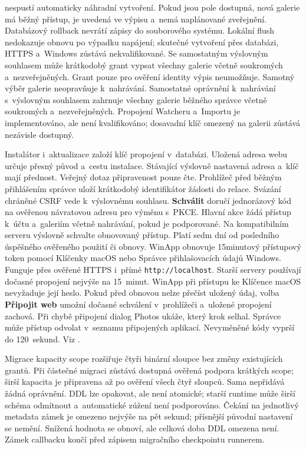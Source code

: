 \documentclass[11pt,a4paper]{article}
\newcommand{\filepath}[1]{\path{#1}}
\newcommand{\ui}[1]{\textbf{#1}}
\begin{document}
nespustí automaticky náhradní vytvoření. Pokud jsou pole dostupná, nová galerie má běžný přístup, je uvedená
ve výpisu a~nemá naplánované zveřejnění. Databázový rollback
nevrátí zápisy do souborového systému.
Lokální flush nedokazuje obnovu po výpadku napájení; skutečné vytvoření přes
databázi, HTTPS a~Windows zůstává nekvalifikované.
Se samostatným výslovným souhlasem může krátkodobý grant
vypsat všechny galerie včetně soukromých a~nezveřejněných. Grant pouze pro
ověření identity výpis neumožňuje. Samotný výběr galerie neopravňuje
k~nahrávání. Samostatné oprávnění k~nahrávání s~výslovným souhlasem zahrnuje
všechny galerie běžného správce včetně soukromých a~nezveřejněných.
Propojení Watcheru a~Importu je implementováno, ale není kvalifikováno;
dosavadní klíč omezený na galerii zůstává nezávisle dostupný.

Instalátor i~aktualizace založí klíč propojení v~databázi. Uložená
adresa webu určuje přesný původ a~cestu instalace. Stávající výslovně nastavená
adresa a~klíč mají přednost. Veřejný dotaz připravenost pouze čte. Prohlížeč před
běžným přihlášením správce uloží krátkodobý identifikátor žádosti do relace.
Svázání chráněné CSRF vede k~výslovnému souhlasu. \ui{Schválit} doručí
jednorázový kód na ověřenou návratovou adresu pro výměnu s~PKCE. Hlavní akce žádá přístup k~účtu a~galeriím včetně nahrávání, pokud je
podporované. Na kompatibilním serveru výslovně schvalte obnovovaný přístup.
Platí sedm dní od posledního úspěšného ověřeného použití či obnovy. WinApp
obnovuje 15minutový přístupový token pomocí Klíčenky macOS nebo Správce
přihlašovacích údajů Windows. Funguje přes ověřené HTTPS i~přímé
\texttt{http://localhost}. Starší servery používají dočasné propojení nejvýše
na 15~minut.
WinApp při přístupu ke Klíčence macOS nevyžaduje její heslo. Pokud před obnovou
nelze přečíst uložený údaj, volba \ui{Připojit web} umožní dočasné schválení
v~prohlížeči a~uložené propojení zachová.
Při chybě připojení dialog Photos ukáže, který krok selhal.
Správce může přístup odvolat v~seznamu připojených
aplikací. Nevyměněné kódy vyprší do 120~sekund. Viz
\filepath{docs/APP_LINKING_PHASE_0.md}.

Migrace kapacity scope rozšiřuje čtyři binární sloupce bez změny existujících
grantů. Při částečné migraci zůstává dostupná ověřená podpora krátkých scope;
širší kapacita je připravena až po ověření všech čtyř sloupců. Sama nepřidává
žádná oprávnění. DDL lze opakovat, ale není atomické; starší runtime může širší
schéma odmítnout a~automatické zúžení není podporováno.
Čekání na jednotlivý metadata zámek je omezeno nejvýše na pět sekund; přísnější
původní nastavení se nemění. Snížená hodnota se obnoví, ale celková doba DDL
omezena není. Zámek callbacku
končí před zápisem migračního checkpointu runnerem.
\end{document}
